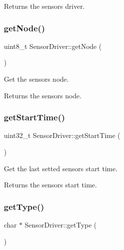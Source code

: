 \begin{DoxyReturn}{Returns}
the sensor\textquotesingle{}s driver. 
\end{DoxyReturn}
\mbox{\label{classSensorDriver_a30e20150ec52e3ec3a7257978e533618}} 
\subsubsection{\texorpdfstring{get\+Node()}{getNode()}}
{\footnotesize\ttfamily uint8\+\_\+t Sensor\+Driver\+::get\+Node (\begin{DoxyParamCaption}{ }\end{DoxyParamCaption})}



Get the sensor\textquotesingle{}s node. 

\begin{DoxyReturn}{Returns}
the sensor\textquotesingle{}s node. 
\end{DoxyReturn}
\mbox{\label{classSensorDriver_a8636758f202044a24e916d10bf339f10}} 
\subsubsection{\texorpdfstring{get\+Start\+Time()}{getStartTime()}}
{\footnotesize\ttfamily uint32\+\_\+t Sensor\+Driver\+::get\+Start\+Time (\begin{DoxyParamCaption}{ }\end{DoxyParamCaption})}



Get the last setted sensor\textquotesingle{}s start time. 

\begin{DoxyReturn}{Returns}
the sensor\textquotesingle{}s start time. 
\end{DoxyReturn}
\mbox{\label{classSensorDriver_a3d87944d9f86320f645af7dad549e4a8}} 
\subsubsection{\texorpdfstring{get\+Type()}{getType()}}
{\footnotesize\ttfamily char $\ast$ Sensor\+Driver\+::get\+Type (\begin{DoxyParamCaption}{ }\end{DoxyParamCaption})}



